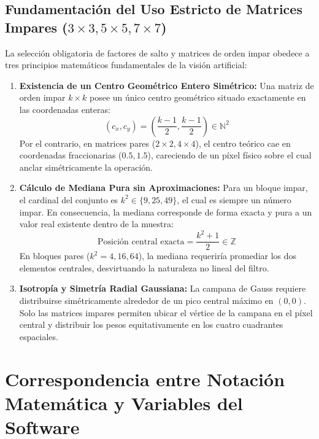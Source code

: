 \documentclass{article}
\begin{document}
\subsection{Fundamentación del Uso Estricto de Matrices Impares \texorpdfstring{($3\times3, 5\times5, 7\times7$)}{(3x3, 5x5, 7x7)}}
La selección obligatoria de factores de salto y matrices de orden impar obedece a tres principios matemáticos fundamentales de la visión artificial:
\begin{enumerate}
    \item \textbf{Existencia de un Centro Geométrico Entero Simétrico:} Una matriz de orden impar $k \times k$ posee un único centro geométrico situado exactamente en las coordenadas enteras:
    \begin{equation}
        (c_x, c_y) = \left( \frac{k-1}{2}, \frac{k-1}{2} \right) \in \mathbb{N}^2
    \end{equation}
    Por el contrario, en matrices pares ($2\times2, 4\times4$), el centro teórico cae en coordenadas fraccionarias ($0.5, 1.5$), careciendo de un píxel físico sobre el cual anclar simétricamente la operación.
    \item \textbf{Cálculo de Mediana Pura sin Aproximaciones:} Para un bloque impar, el cardinal del conjunto es $k^2 \in \{9, 25, 49\}$, el cual es siempre un número impar. En consecuencia, la mediana corresponde de forma exacta y pura a un valor real existente dentro de la muestra:
    \begin{equation}
        \text{Posición central exacta} = \frac{k^2 + 1}{2} \in \mathbb{Z}
    \end{equation}
    En bloques pares ($k^2 = 4, 16, 64$), la mediana requeriría promediar los dos elementos centrales, desvirtuando la naturaleza no lineal del filtro.
    \item \textbf{Isotropía y Simetría Radial Gaussiana:} La campana de Gauss requiere distribuirse simétricamente alrededor de un pico central máximo en $(0, 0)$. Solo las matrices impares permiten ubicar el vértice de la campana en el píxel central y distribuir los pesos equitativamente en los cuatro cuadrantes espaciales.
\end{enumerate}


\section{Correspondencia entre Notación Matemática y Variables del Software}
\end{document}
